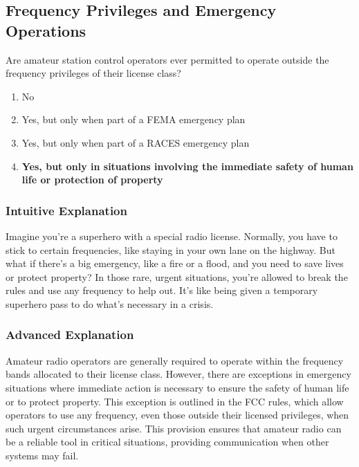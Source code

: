 \subsection{Frequency Privileges and Emergency Operations}
\label{T2C09}

\begin{tcolorbox}[colback=gray!10!white,colframe=black!75!black,title=T2C09]
Are amateur station control operators ever permitted to operate outside the frequency privileges of their license class?
\begin{enumerate}[noitemsep]
    \item No
    \item Yes, but only when part of a FEMA emergency plan
    \item Yes, but only when part of a RACES emergency plan
    \item \textbf{Yes, but only in situations involving the immediate safety of human life or protection of property}
\end{enumerate}
\end{tcolorbox}

\subsubsection*{Intuitive Explanation}
Imagine you're a superhero with a special radio license. Normally, you have to stick to certain frequencies, like staying in your own lane on the highway. But what if there's a big emergency, like a fire or a flood, and you need to save lives or protect property? In those rare, urgent situations, you're allowed to break the rules and use any frequency to help out. It's like being given a temporary superhero pass to do what's necessary in a crisis.

\subsubsection*{Advanced Explanation}
Amateur radio operators are generally required to operate within the frequency bands allocated to their license class. However, there are exceptions in emergency situations where immediate action is necessary to ensure the safety of human life or to protect property. This exception is outlined in the FCC rules, which allow operators to use any frequency, even those outside their licensed privileges, when such urgent circumstances arise. This provision ensures that amateur radio can be a reliable tool in critical situations, providing communication when other systems may fail.